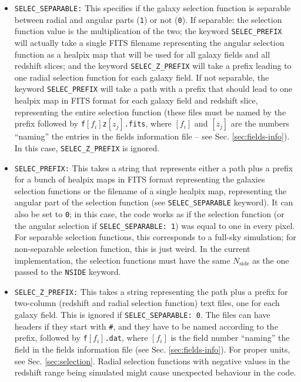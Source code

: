 \documentclass[12pt]{book} %
\newcommand{\nv}[1]{\mathrm{#1}}                 %
\begin{document}
\begin{itemize}
\item {\tt SELEC\_SEPARABLE:} This specifies if the galaxy selection function is separable between 
  radial and angular parts ({\tt 1}) or not ({\tt 0}). If separable: the selection function value is 
  the multiplication of the two; the keyword {\tt SELEC\_PREFIX} 
  will actually take a single FITS filename representing the angular selection function 
  as a {\sc healpix} map that will be used for all galaxy fields and all redshift slices; and the 
  keyword {\tt SELEC\_Z\_PREFIX} will take a prefix leading to one radial selection function for each 
  galaxy field. If not separable, the keyword {\tt SELEC\_PREFIX} will take a path with a prefix that 
  should lead to one {\sc healpix} map in FITS format for each galaxy field and redshift slice, 
  representing the entire selection function (these files must be named by the prefix followed by 
  {\tt f}$[f_i]${\tt z}$[z_j]${\tt .fits}, where $[f_i]$ and $[z_j]$ are the numbers ``naming'' 
  the entries in the fields information file -- see Sec. \ref{sec:fields-info}). 
  In this case, {\tt SELEC\_Z\_PREFIX} is ignored.

\item {\tt SELEC\_PREFIX:} This takes a string that represents either a path plus a prefix for 
  a bunch of {\sc healpix} maps in FITS format representing the galaxies selection functions 
  or the filename of a single {\sc healpix} map, representing the angular 
  part of the selection function (see {\tt SELEC\_SEPARABLE} keyword). It can also be set to 
  {\tt 0}; in this case, the code works as if the selection function (or the angular selection 
  if {\tt SELEC\_SEPARABLE: 1}) was equal to one in every pixel. For separable selection functions, 
  this corresponds to a full-sky simulation; for non-separable selection function, this is just weird. 
  In the current implementation, the selection functions must have the same $N_{\nv{side}}$ as the one 
  passed to the {\tt NSIDE} keyword.

\item {\tt SELEC\_Z\_PREFIX:} This takes a string representing the path plus a prefix for 
  two-column (redshift and radial selection function) text files, one for each galaxy field. 
  This is ignored if {\tt SELEC\_SEPARABLE: 0}. The files can have headers if they start with {\tt \#}, 
  and they have to be named according to the prefix, followed by {\tt f}$[f_i]${\tt .dat}, where 
  $[f_i]$ is the field number ``naming'' the field in the fields information file (see Sec. 
  \ref{sec:fields-info}). For proper units, see Sec. \ref{sec:selection}. Radial selection functions 
  with negative values in the redshift range being simulated might cause unexpected behaviour in the code.


\end{itemize}
\end{document}

